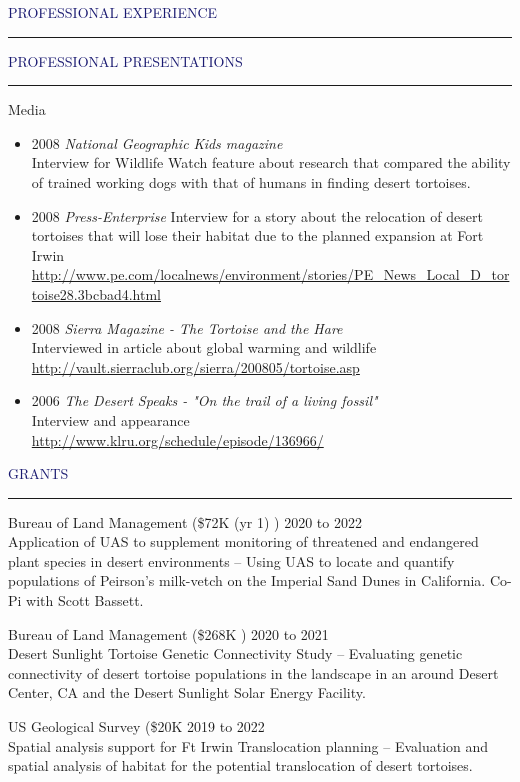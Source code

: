 \documentclass{resume} %
\renewenvironment{rSection}[1]{
\sectionskip
\textcolor{MidnightBlue}{\MakeUppercase{#1}}
\sectionlineskip
\hrule
\begin{list}{}{
\setlength{\leftmargin}{1.5em}
}
\item[]
}{
\end{list}
}
\begin{document}
\begin{rSection}{Professional Experience}
\begin{rSection}{Professional Presentations}
\begin{rSubsection}{Media}{}{}{}
\begin{itemize}
\item 2008 \textit{National Geographic Kids magazine} \\
Interview for Wildlife Watch feature about research that compared the ability of trained working dogs with that of humans in finding desert tortoises.
\item 2008 \textit{Press-Enterprise} Interview for a story about the relocation of desert tortoises that will lose their habitat due to the planned expansion at Fort Irwin \\ \url{http://www.pe.com/localnews/environment/stories/PE_News_Local_D_tortoise28.3bcbad4.html}
\item 2008\textit{ Sierra Magazine - The Tortoise and the Hare} \\
Interviewed in article about global warming and wildlife \\ \url{http://vault.sierraclub.org/sierra/200805/tortoise.asp}
\item 2006 \textit{The Desert Speaks - "On the trail of a living fossil"} \\ Interview and appearance \\
\url{http://www.klru.org/schedule/episode/136966/}
\end{itemize}

\end{rSubsection}

\end{rSection}
\begin{rSection}{Grants}{}
\item Bureau of Land Management (\$72K (yr 1)
) \hfill 2020 to 2022  \\
Application of UAS to supplement monitoring of threatened and endangered plant species in desert environments
-- Using UAS to locate and quantify populations of Peirson's milk-vetch on the Imperial Sand Dunes in California. Co-Pi  with Scott Bassett.

\item Bureau of Land Management (\$268K 
) \hfill 2020 to 2021  \\
Desert Sunlight Tortoise Genetic Connectivity Study
 -- Evaluating genetic connectivity of desert tortoise populations in the landscape in an around Desert Center, CA and the Desert Sunlight Solar Energy Facility.

\item US Geological Survey (\$20K
 \hfill 2019 to 2022  \\
Spatial analysis support for Ft Irwin Translocation planning
-- Evaluation and spatial analysis of habitat for the potential translocation of desert tortoises.


\end{rSection}
\end{rSection}
\end{document}
